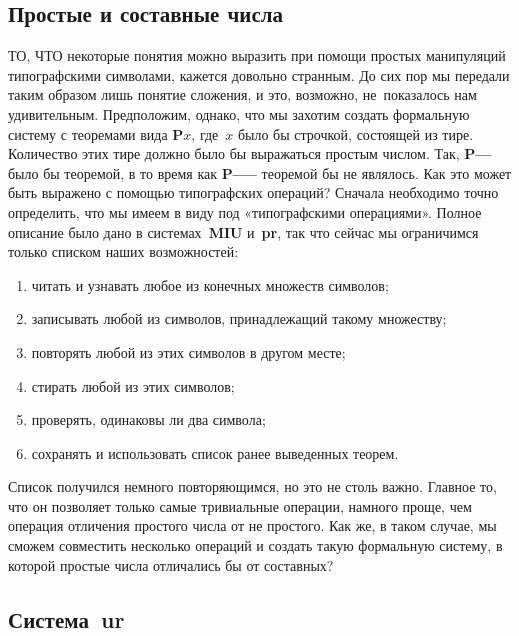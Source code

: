 \documentclass[../main.tex]{subfiles}
\begin{document}

\subsection{Простые и составные числа}

ТО, ЧТО некоторые понятия можно выразить при помощи простых манипуляций типографскими символами, кажется довольно странным. До сих пор мы передали таким образом лишь понятие сложения, и это, возможно, не~показалось нам удивительным. Предположим, однако, что мы захотим создать формальную систему с теоремами вида \textbf{P$x$}, где~$x$ было бы строчкой, состоящей из тире. Количество этих тире должно было бы выражаться простым числом. Так, \textbf{P--{}--} было бы теоремой, в то время как \textbf{P--{}--{}--} теоремой бы не являлось. Как это может быть выражено с помощью типографских операций? Сначала необходимо точно определить, что мы имеем в виду под «типографскими операциями». Полное описание было дано в системах~\textbf{MIU} и~\textbf{pr}, так что сейчас мы ограничимся только списком наших возможностей:

\begin{enumerate}[label=(\arabic*), noitemsep, topsep=6pt]
    \item читать и узнавать любое из конечных множеств символов;
    \item записывать любой из символов, принадлежащий такому множеству;
    \item повторять любой из этих символов в другом месте;
    \item стирать любой из этих символов;
    \item проверять, одинаковы ли два символа;
    \item сохранять и использовать список ранее выведенных теорем.
\end{enumerate}

Список получился немного повторяющимся, но это не столь важно. Главное то, что он позволяет только самые тривиальные операции, намного проще, чем операция отличения простого числа от не простого. Как же, в таком случае, мы сможем совместить несколько операций и создать такую формальную систему, в которой простые числа отличались бы от составных?

\subsection{Система~\textbf{ur}}
\end{document}
